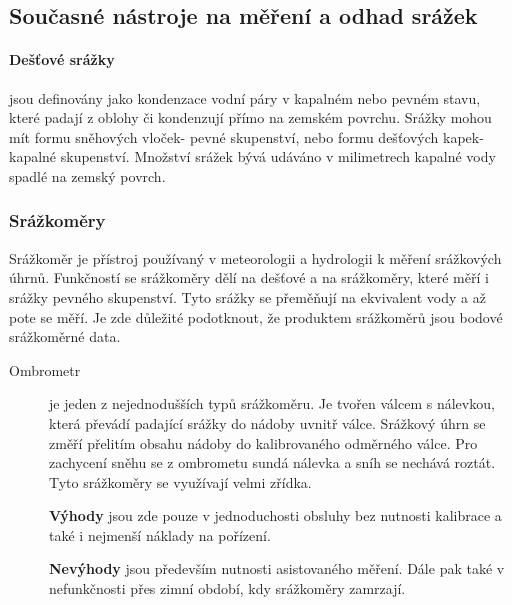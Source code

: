 \documentclass[a4paper,12pt]{article}
\begin{document}
\subsection{Současné nástroje na měření a odhad srážek}

\paragraph*{Dešťové srážky}jsou definovány jako kondenzace vodní páry v kapalném nebo pevném stavu, které padají z oblohy či kondenzují přímo na zemském povrchu. Srážky mohou mít formu sněhových vloček- pevné skupenství, nebo formu dešťových kapek- kapalné skupenství. Množství srážek bývá udáváno v milimetrech kapalné vody spadlé na zemský povrch.\cite{wmo}

\subsubsection{Srážkoměry}
Srážkoměr je přístroj používaný v meteorologii a hydrologii k měření srážkových úhrnů. Funkčností se srážkoměry dělí na dešťové  a na srážkoměry, které měří i srážky pevného skupenství. Tyto srážky se přeměňují na ekvivalent vody a až pote se měří. Je zde důležité podotknout, že produktem srážkoměrů jsou bodové srážkoměrné data.


\begin{description} 
\item[Ombrometr]je jeden z nejednodušších typů srážkoměru. Je tvořen válcem s nálevkou, která převádí padající srážky do nádoby uvnitř válce. Srážkový úhrn se změří přelitím obsahu nádoby do kalibrovaného odměrného válce. Pro zachycení sněhu se z ombrometu sundá nálevka a sníh se nechává roztát. Tyto srážkoměry se využívají velmi zřídka.

\textbf{Výhody} jsou zde pouze v jednoduchosti obsluhy bez nutnosti kalibrace a také i nejmenší náklady na pořízení.
   
\textbf{Nevýhody} jsou především nutnosti asistovaného měření. Dále pak také v nefunkčnosti přes zimní období, kdy srážkoměry zamrzají. 
\end{description}
\end{document}
